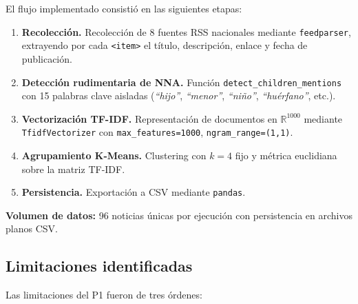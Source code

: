 El flujo implementado consistió en las siguientes etapas:

\begin{enumerate}
    \item \textbf{Recolección.} Recolección de 8 fuentes RSS nacionales mediante
          \texttt{feedparser}, extrayendo por cada \texttt{<item>} el título, descripción,
          enlace y fecha de publicación.
    \item \textbf{Detección rudimentaria de NNA.} Función \texttt{detect\_children\_mentions}
          con 15 palabras clave aisladas (\textit{``hijo''}, \textit{``menor''},
          \textit{``niño''}, \textit{``huérfano''}, etc.).
    \item \textbf{Vectorización TF-IDF.} Representación de documentos en
          $\mathbb{R}^{1000}$ mediante \texttt{TfidfVectorizer} con
          \texttt{max\_features=1000}, \texttt{ngram\_range=(1,1)}.
    \item \textbf{Agrupamiento K-Means.} Clustering con $k=4$ fijo y métrica
          euclidiana sobre la matriz TF-IDF.
    \item \textbf{Persistencia.} Exportación a CSV mediante \texttt{pandas}.
\end{enumerate}

\textbf{Volumen de datos:} 96 noticias únicas por ejecución con persistencia en
archivos planos CSV.

\subsection{Limitaciones identificadas}
\label{subsec:p1_limitaciones}

Las limitaciones del P1 fueron de tres órdenes:

